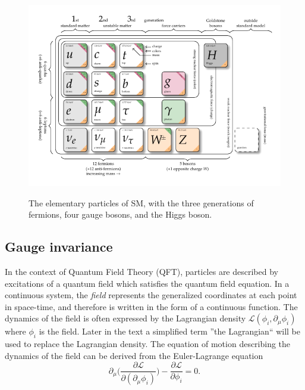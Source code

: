 \begin{figure}[!ht]
  \begin{center}  
    \includegraphics[width=1.0\textwidth]{Fig/model-physics}\\
    \caption{The elementary particles of SM, with the three generations of fermions, four gauge bosons, and the Higgs boson. \label{fig:SMgraph}} 
  \end{center}
\end{figure} 

\subsection{Gauge invariance}
In the context of Quantum Field Theory (QFT), particles are described by excitations of a quantum field which satisfies the quantum field equation. In a continuous system, the \emph{field} represents the generalized coordinates at each point in space-time, and therefore is written in the form of a continuous function. The dynamics of the field is often expressed by the Lagrangian density $\mathcal{L}(\phi_{i},\partial_{\mu}\phi_{i})$ where $\phi_{i}$ is the field. Later in the text a simplified term ''the Lagrangian`` will be used to replace the Lagrangian density.
The equation of motion describing the dynamics of the field can be derived from the Euler-Lagrange equation 
\begin{equation}
\partial_{\mu}\bigg(\frac{\partial\mathcal{L}}{\partial(\partial_{\mu}\phi_{i})}\bigg)-\frac{\partial\mathcal{L}}{\partial\phi_{i}}=0.
\end{equation}

